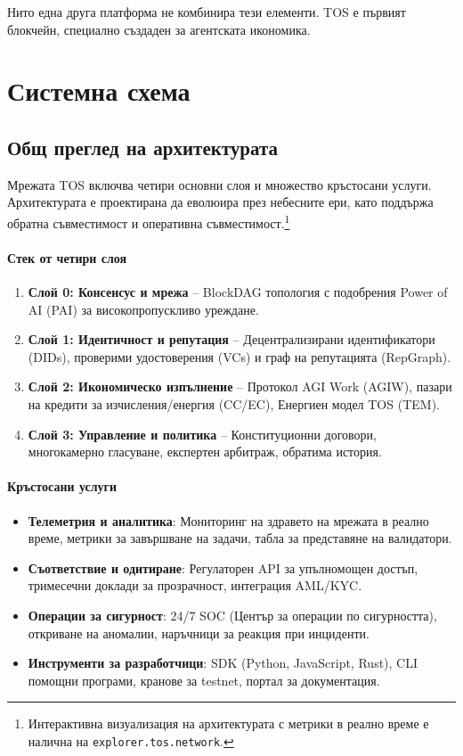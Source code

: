 \documentclass[11pt]{article}
\begin{document}
Нито една друга платформа не комбинира тези елементи. TOS е първият блокчейн, специално създаден за агентската икономика.

\section{Системна схема}
\subsection{Общ преглед на архитектурата}
Мрежата TOS включва четири основни слоя и множество кръстосани услуги. Архитектурата е проектирана да еволюира през небесните ери, като поддържа обратна съвместимост и оперативна съвместимост.\footnote{Интерактивна визуализация на архитектурата с метрики в реално време е налична на \texttt{explorer.tos.network}.}

\paragraph{Стек от четири слоя}
\begin{enumerate}[noitemsep]
  \item \textbf{Слой 0: Консенсус и мрежа} -- BlockDAG топология с подобрения Power of AI (PAI) за високопропускливо уреждане.
  \item \textbf{Слой 1: Идентичност и репутация} -- Децентрализирани идентификатори (DIDs), проверими удостоверения (VCs) и граф на репутацията (RepGraph).
  \item \textbf{Слой 2: Икономическо изпълнение} -- Протокол AGI Work (AGIW), пазари на кредити за изчисления/енергия (CC/EC), Енергиен модел TOS (TEM).
  \item \textbf{Слой 3: Управление и политика} -- Конституционни договори, многокамерно гласуване, експертен арбитраж, обратима история.
\end{enumerate}

\paragraph{Кръстосани услуги}
\begin{itemize}[noitemsep]
  \item \textbf{Телеметрия и аналитика}: Мониторинг на здравето на мрежата в реално време, метрики за завършване на задачи, табла за представяне на валидатори.
  \item \textbf{Съответствие и одитиране}: Регулаторен API за упълномощен достъп, тримесечни доклади за прозрачност, интеграция AML/KYC.
  \item \textbf{Операции за сигурност}: 24/7 SOC (Център за операции по сигурността), откриване на аномалии, наръчници за реакция при инциденти.
  \item \textbf{Инструменти за разработчици}: SDK (Python, JavaScript, Rust), CLI помощни програми, кранове за testnet, портал за документация.
\end{itemize}
\end{document}
